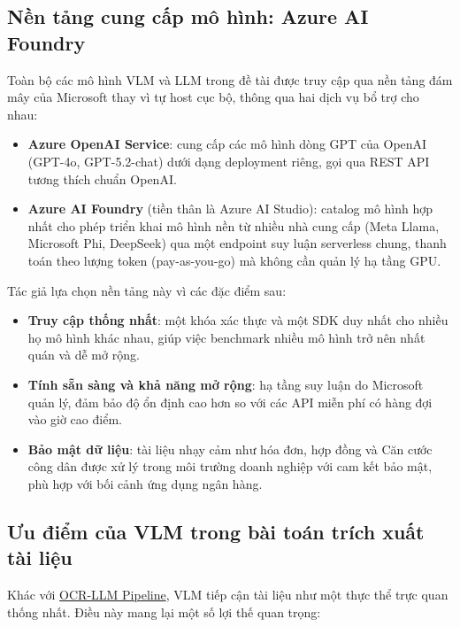 ﻿\documentclass[12pt]{report}
\begin{document}
\subsection{Nền tảng cung cấp mô hình: Azure AI Foundry}\label{sec:azure_foundry}

Toàn bộ các mô hình VLM và LLM trong đề tài được truy cập qua nền tảng đám mây của Microsoft thay vì tự host cục bộ, thông qua hai dịch vụ bổ trợ cho nhau:

\begin{itemize}
    \item \textbf{Azure OpenAI Service}: cung cấp các mô hình dòng GPT của OpenAI (GPT-4o, GPT-5.2-chat) dưới dạng deployment riêng, gọi qua REST API tương thích chuẩn OpenAI.
    \item \textbf{Azure AI Foundry} (tiền thân là Azure AI Studio): catalog mô hình hợp nhất cho phép triển khai mô hình nền từ nhiều nhà cung cấp (Meta Llama, Microsoft Phi, DeepSeek) qua một endpoint suy luận serverless chung, thanh toán theo lượng token (pay-as-you-go) mà không cần quản lý hạ tầng GPU.
\end{itemize}

Tác giả lựa chọn nền tảng này vì các đặc điểm sau:

\begin{itemize}
    \item \textbf{Truy cập thống nhất}: một khóa xác thực và một SDK duy nhất cho nhiều họ mô hình khác nhau, giúp việc benchmark nhiều mô hình trở nên nhất quán và dễ mở rộng.
    \item \textbf{Tính sẵn sàng và khả năng mở rộng}: hạ tầng suy luận do Microsoft quản lý, đảm bảo độ ổn định cao hơn so với các API miễn phí có hàng đợi vào giờ cao điểm.
    \item \textbf{Bảo mật dữ liệu}: tài liệu nhạy cảm như hóa đơn, hợp đồng và Căn cước công dân được xử lý trong môi trường doanh nghiệp với cam kết bảo mật, phù hợp với bối cảnh ứng dụng ngân hàng.
\end{itemize}

\subsection{Ưu điểm của VLM trong bài toán trích xuất tài liệu}\label{sec:vlm_advantages}

Khác với \hyperref[sec:ocr_llm_pipeline]{OCR-LLM Pipeline}, VLM tiếp cận tài liệu như một thực thể trực quan thống nhất. Điều này mang lại một số lợi thế quan trọng:
\end{document}
